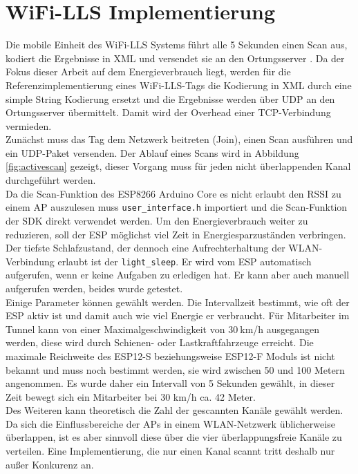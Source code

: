\section{WiFi-LLS Implementierung}
\label{ch:phase1:sec:wifills}
Die mobile Einheit des WiFi-LLS Systems führt alle 5 Sekunden einen Scan aus, kodiert die Ergebnisse in XML und versendet sie an den Ortungsserver \cite{chen2007design}.
Da der Fokus dieser Arbeit auf dem Energieverbrauch liegt, werden für die Referenzimplementierung eines WiFi-LLS-Tags die Kodierung in XML durch eine simple String Kodierung ersetzt und die Ergebnisse werden über UDP an den Ortungsserver übermittelt. 
Damit wird der Overhead einer TCP-Verbindung vermieden.\\
Zunächst muss das Tag dem Netzwerk beitreten (Join), einen Scan ausführen und ein UDP-Paket versenden.
Der Ablauf eines Scans wird in Abbildung \ref{fig:activescan} gezeigt, dieser Vorgang muss für jeden nicht überlappenden Kanal durchgeführt werden.\\
Da die Scan-Funktion des ESP8266 Arduino Core es nicht erlaubt den RSSI zu einem AP auszulesen muss \texttt{user\_interface.h} importiert und die Scan-Funktion der SDK direkt verwendet werden.
Um den Energieverbrauch weiter zu reduzieren, soll der ESP möglichst viel Zeit in Energiesparzuständen verbringen.
Der tiefste Schlafzustand, der dennoch eine Aufrechterhaltung der WLAN-Verbindung erlaubt ist der \texttt{light\_sleep}. 
Er wird vom ESP automatisch aufgerufen, wenn er keine Aufgaben zu erledigen hat.
Er kann aber auch manuell aufgerufen werden, beides wurde getestet.\\
Einige Parameter können gewählt werden. 
Die Intervallzeit bestimmt, wie oft der ESP aktiv ist und damit auch wie viel Energie er verbraucht.
Für Mitarbeiter im Tunnel kann von einer Maximalgeschwindigkeit von $30\ $km/h ausgegangen werden, diese wird durch Schienen- oder Lastkraftfahrzeuge erreicht. 
Die maximale Reichweite des ESP12-S beziehungsweise ESP12-F Moduls ist nicht bekannt und muss noch bestimmt werden, sie wird zwischen 50 und 100 Metern angenommen.
Es wurde daher ein Intervall von 5 Sekunden gewählt, in dieser Zeit bewegt sich ein Mitarbeiter bei 30 km/h ca. 42 Meter.\\
Des Weiteren kann theoretisch die Zahl der gescannten Kanäle gewählt werden. 
Da sich die Einflussbereiche der APs in einem WLAN-Netzwerk üblicherweise überlappen, ist es aber sinnvoll diese über die vier überlappungsfreie Kanäle zu verteilen. 
Eine Implementierung, die nur einen Kanal scannt tritt deshalb nur außer Konkurenz an.\\

